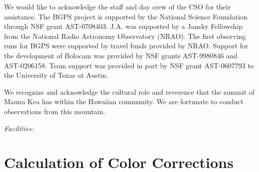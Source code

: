 \documentclass[12pt,preprint]{aastex}
\begin{document}
\acknowledgments

We would like to acknowledge the staff and day crew of the CSO for their
assistance. The BGPS project is supported by the National Science Foundation
through NSF grant AST-0708403. J.A. was supported by a Jansky Fellowship from
the National Radio Astronomy Observatory (NRAO). The first observing runs for
BGPS were supported by travel funds provided by NRAO. Support for the
development of Bolocam was provided by NSF grants AST-9980846 and AST-0206158.
Team support was provided in part by NSF grant AST-0607793 to the
University of Texas at Austin.

We recognize and acknowledge the cultural role and reverence that the
summit of Mauna Kea has within the Hawaiian community. We are
fortunate to conduct observations from this mountain.

{\it Facilities:} 

\appendix

\section{Calculation of Color Corrections}
\label{app:ColorCorrections}
\end{document}
